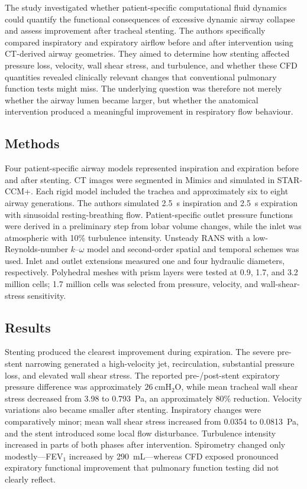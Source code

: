 \documentclass[11pt,a4paper]{article}
\begin{document}
The study investigated whether patient-specific computational fluid dynamics
could quantify the functional consequences of excessive dynamic airway collapse
and assess improvement after tracheal stenting. The authors specifically
compared inspiratory and expiratory airflow before and after intervention using
CT-derived airway geometries. They aimed to determine how stenting affected
pressure loss, velocity, wall shear stress, and turbulence, and whether these
CFD quantities revealed clinically relevant changes that conventional pulmonary
function tests might miss. The underlying question was therefore not merely
whether the airway lumen became larger, but whether the anatomical intervention
produced a meaningful improvement in respiratory flow behaviour.

\subsection{Methods}

Four patient-specific airway models represented inspiration and expiration
before and after stenting. CT images were segmented in Mimics and simulated in
STAR-CCM+. Each rigid model included the trachea and approximately six to eight
airway generations. The authors simulated 2.5~s inspiration and 2.5~s expiration
with sinusoidal resting-breathing flow. Patient-specific outlet pressure
functions were derived in a preliminary step from lobar volume changes, while
the inlet was atmospheric with 10\% turbulence intensity. Unsteady RANS with a
low-Reynolds-number $k$--$\omega$ model and second-order spatial and temporal
schemes was used. Inlet and outlet extensions measured one and four hydraulic
diameters, respectively. Polyhedral meshes with prism layers were tested at
0.9, 1.7, and 3.2 million cells; 1.7 million cells was selected from pressure,
velocity, and wall-shear-stress sensitivity.

\subsection{Results}

Stenting produced the clearest improvement during expiration. The severe
pre-stent narrowing generated a high-velocity jet, recirculation, substantial
pressure loss, and elevated wall shear stress. The reported pre-/post-stent
expiratory pressure difference was approximately $26~\mathrm{cmH_2O}$, while
mean tracheal wall shear stress decreased from 3.98 to 0.793~Pa, an approximately
80\% reduction. Velocity variations also became smaller after stenting.
Inspiratory changes were comparatively minor; mean wall shear stress increased
from 0.0354 to 0.0813~Pa, and the stent introduced some local flow disturbance.
Turbulence intensity increased in parts of both phases after intervention.
Spirometry changed only modestly---FEV$_1$ increased by 290~mL---whereas CFD
exposed pronounced expiratory functional improvement that pulmonary function
testing did not clearly reflect.
\end{document}
